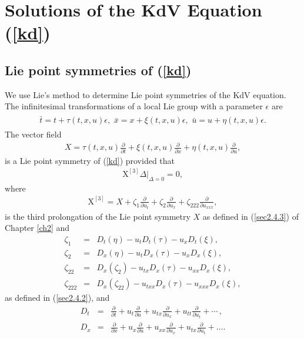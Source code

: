 \section{Solutions of the KdV Equation (\ref{kd})}
\subsection{Lie point symmetries of \label{secv} (\ref{kd}) }

We use  Lie's method to determine Lie point symmetries of the KdV equation. The  infinitesimal transformations of a local  Lie group with a parameter $\epsilon$ are 
\begin{align}
\begin{aligned}
\bar{t}=t+  \tau(t,x,u)\epsilon,\,\,\bar{x}=x+  \xi(t,x,u)\epsilon, \,\,
\bar{u}=u+  \eta(t,x,u)\epsilon.
\label{infintlil} 
\end{aligned}
\end{align}
The vector field
\begin{eqnarray}\label{kdv1}
X =\tau (t,x,u) \frac{\partial}{\partial t} + \xi (t,x, u) \frac{\partial}{\partial x} 
+\eta (t,x,u) \frac{\partial}{\partial u} , 
\end{eqnarray}
is a Lie point symmetry of  (\ref{kd}) provided that
\begin{eqnarray}
\mbox{X}^{[3]}  \Delta \Big|_{\Delta=0} =0 \label{eq},
\end{eqnarray} where
\begin{eqnarray}
	\mbox{X}^{[3]} =X +\zeta_{1}\frac{\partial }{\partial u_{t}}+\zeta_{2}\frac{\partial }{\partial u_{x}}+\zeta_{222}\frac{\partial }{\partial u_{xxx}},
\end{eqnarray} is the third prolongation of the Lie point symmetry $X$ as defined in  (\ref{sec2.4.3}) of Chapter \ref{ch2} and
\begin{eqnarray}
	\zeta_1 &=& D_t (\eta) - u_t D_t (\tau) - u_x D_t (\xi), \\
	\zeta_2 &=& D_x (\eta) - u_t D_x (\tau) - u_x D_x (\xi),\\
	\zeta_{22} &=& D_x(\zeta_2) - u_{tx}D_x(\tau) - u_{xx}D_x(\xi),\\
	\zeta_{222} &=& D_x(\zeta_{22}) - u_{txx}D_x(\tau) - u_{xxx}D_x(\xi),
\end{eqnarray} as defined in  (\ref{sec2.4.2}), and
\begin{eqnarray}
\label{f1} D_t &=& \frac{\partial}{\partial t} + u_t\frac{\partial}{\partial u}
+ u_{tx} \frac{\partial}{\partial u_x} + u_{tt}\frac{\partial}{\partial u_t} + \cdots \, , \\
\label{f2} D_x &=& \frac{\partial}{\partial x} + u_x \frac{\partial}{\partial u} + u_{xx}\frac{\partial}
{\partial u_x} + u_{tx} \frac{\partial}{\partial u_{t}} + \ldots .
\end{eqnarray}
